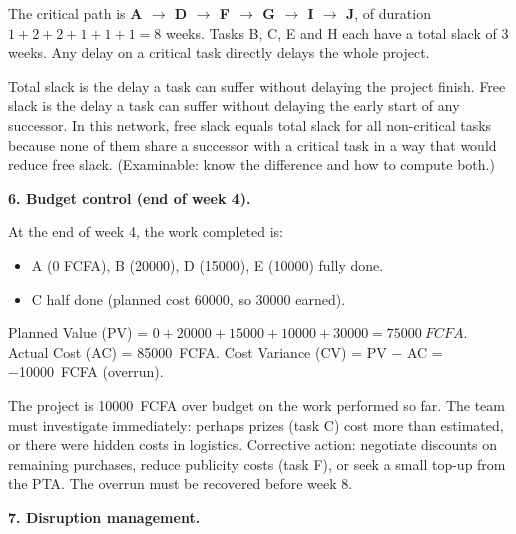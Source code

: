 \documentclass[11pt]{article}
\begin{document}
\begin{propriete}
The critical path is \textbf{A $\rightarrow$ D $\rightarrow$ F $\rightarrow$ G $\rightarrow$ I $\rightarrow$ J}, of duration $1+2+2+1+1+1 = 8$ weeks. Tasks B, C, E and H each have a total slack of 3 weeks. Any delay on a critical task directly delays the whole project.
\end{propriete}

\begin{savaistu}
Total slack is the delay a task can suffer without delaying the project finish. Free slack is the delay a task can suffer without delaying the early start of any successor. In this network, free slack equals total slack for all non-critical tasks because none of them share a successor with a critical task in a way that would reduce free slack. (Examinable: know the difference and how to compute both.)
\end{savaistu}

\textbf{6. Budget control (end of week 4).}

At the end of week 4, the work completed is:
\begin{itemize}
\item A (0 FCFA), B (20000), D (15000), E (10000) fully done.
\item C half done (planned cost 60000, so 30000 earned).
\end{itemize}
Planned Value (PV) = $0 + 20000 + 15000 + 10000 + 30000 = \SI{75000}{FCFA}$.
Actual Cost (AC) = \SI{85000}{FCFA}.
Cost Variance (CV) = PV $-$ AC = \SI{-10000}{FCFA} (overrun).

\begin{attention}
The project is \SI{10000}{FCFA} over budget on the work performed so far. The team must investigate immediately: perhaps prizes (task C) cost more than estimated, or there were hidden costs in logistics. Corrective action: negotiate discounts on remaining purchases, reduce publicity costs (task F), or seek a small top-up from the PTA. The overrun must be recovered before week 8.
\end{attention}

\textbf{7. Disruption management.}
\end{document}
